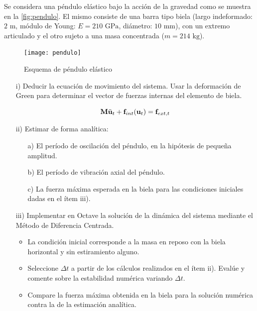 \bigskip
\begin{exercise}
	
	Se considera una péndulo elástico bajo la acción de la gravedad como se muestra en la \autoref{fig:pendulo}. El mismo consiste de una barra tipo biela (largo indeformado: $2\text{ m}$, módulo de Young: $E=210 \text{ GPa}$, diámetro: $10 \text{ mm}$), con un extremo articulado y el otro sujeto a una masa concentrada ($m=214 \text{ kg}$).

		\begin{figure}[htb]
	\centering
	\texttt{[image: pendulo]}
	\caption{Esquema de péndulo elástico}
	\label{fig:pendulo}
\end{figure}


	
	\begin{itemize}
		\item[i)] Deducir la ecuación de movimiento del sistema. Usar la deformación de Green para determinar el vector de fuerzas internas del elemento de biela.
		
		$${\bf M} \ddot{{\bf u}}_t + {\bf f}_{int}({\bf u}_t)={\bf f}_{ext,t}$$
		
		\item[ii)] Estimar de forma analítica:
		\begin{itemize}
			\item[a)] El período de oscilación del péndulo, en la hipótesis de pequeña amplitud.
			\item[b)] El período de vibración axial del péndulo.
			\item[c)] La fuerza máxima esperada en la biela para las condiciones iniciales dadas en el ítem iii).
		\end{itemize}
		
		\item[iii)] Implementar en Octave la solución de la dinámica del sistema mediante el Método de Diferencia Centrada. 
		
		\begin{itemize}
			\item La condición inicial corresponde a la masa en reposo con la biela horizontal y sin estiramiento alguno.
			\item Seleccione $\Delta t$ a partir de los cálculos realizados en el ítem ii). Evalúe y comente sobre la estabilidad numérica variando $\Delta t$.
			\item Compare la fuerza máxima  obtenida en la biela para la solución numérica contra la de la estimación analítica.
		\end{itemize}
				
	\end{itemize}
	
\end{exercise}

